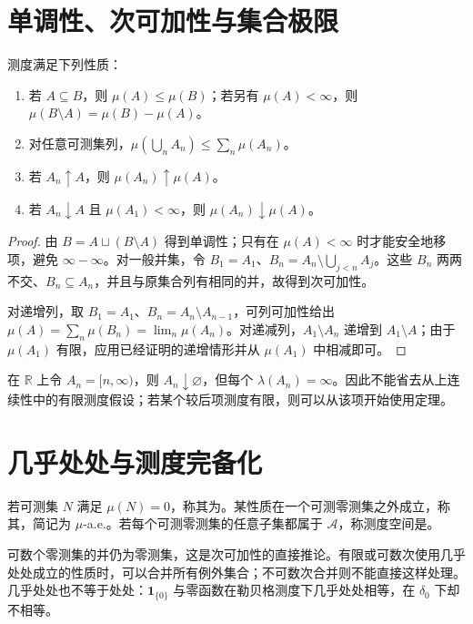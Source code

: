 \documentclass[UTF8,12pt,a4paper,fontset=fandol]{ctexbook}
\begin{document}
\section{单调性、次可加性与集合极限}
\begin{proposition}
测度满足下列性质：
\begin{enumerate}
 \item 若 $A\subseteq B$，则 $\mu(A)\leq\mu(B)$；若另有 $\mu(A)<\infty$，则 $\mu(B\setminus A)=\mu(B)-\mu(A)$。
 \item 对任意可测集列，$\mu(\bigcup_nA_n)\leq\sum_n\mu(A_n)$。
 \item 若 $A_n\uparrow A$，则 $\mu(A_n)\uparrow\mu(A)$。
 \item 若 $A_n\downarrow A$ 且 $\mu(A_1)<\infty$，则 $\mu(A_n)\downarrow\mu(A)$。
\end{enumerate}
\label{prop:mt-measure-continuity}
\end{proposition}
\begin{proof}
由 $B=A\sqcup(B\setminus A)$ 得到单调性；只有在 $\mu(A)<\infty$ 时才能安全地移项，避免 $\infty-\infty$。对一般并集，令 $B_1=A_1$、$B_n=A_n\setminus\bigcup_{j<n}A_j$。这些 $B_n$ 两两不交、$B_n\subseteq A_n$，并且与原集合列有相同的并，故得到次可加性。

对递增列，取 $B_1=A_1$、$B_n=A_n\setminus A_{n-1}$，可列可加性给出 $\mu(A)=\sum_n\mu(B_n)=\lim_n\mu(A_n)$。对递减列，$A_1\setminus A_n$ 递增到 $A_1\setminus A$；由于 $\mu(A_1)$ 有限，应用已经证明的递增情形并从 $\mu(A_1)$ 中相减即可。
\end{proof}

\begin{example}[从上连续性需要有限性条件]
在 $\mathbb R$ 上令 $A_n=[n,\infty)$，则 $A_n\downarrow\varnothing$，但每个 $\lambda(A_n)=\infty$。因此不能省去从上连续性中的有限测度假设；若某个较后项测度有限，则可以从该项开始使用定理。
\end{example}

\section{几乎处处与测度完备化}
\begin{definition}
若可测集 $N$ 满足 $\mu(N)=0$，称其为。某性质在一个可测零测集之外成立，称其，简记为 $\mu$-a.e.。若每个可测零测集的任意子集都属于 $\mathcal A$，称测度空间是。
\end{definition}

可数个零测集的并仍为零测集，这是次可加性的直接推论。有限或可数次使用几乎处处成立的性质时，可以合并所有例外集合；不可数次合并则不能直接这样处理。几乎处处也不等于处处：$\mathbf1_{\{0\}}$ 与零函数在勒贝格测度下几乎处处相等，在 $\delta_0$ 下却不相等。
\end{document}
